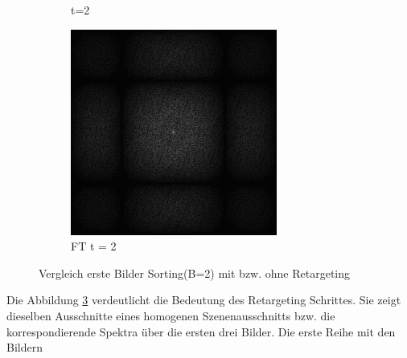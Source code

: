 \begin{figure}[H]
\begin{tcolorbox}[boxrule=4pt,sharp corners=downhill,title=Bedeutung des Retargeting]
\begin{subfigure}[b]{0.2\linewidth}
         \caption{t=2}
         \label{pic:retarget_screen_t2}
    \end{subfigure}
    \begin{subfigure}[b]{0.2\linewidth}
        \includegraphics[width=\linewidth]{content/TemporalerAlg/Bilder/Retargeting/Bedeutung Retargeting/Sorting_Small_Block_WithRetargeting/Spektrum/Ausschnitt3.png}
         \caption{FT t = 2}
         \label{pic:retarget_t2}
    \end{subfigure}
    \end{tcolorbox}
    \caption{Vergleich erste Bilder Sorting(B=2) mit bzw. ohne Retargeting}
    \label{fig:VergleichRetargetSorting}
\end{figure}

Die Abbildung \ref{fig:VergleichRetargetSorting} verdeutlicht die Bedeutung des Retargeting 
Schrittes. Sie zeigt dieselben Ausschnitte eines homogenen Szenenausschnitts bzw. die korrespondierende 
Spektra über die ersten drei Bilder. Die erste Reihe mit den Bildern

